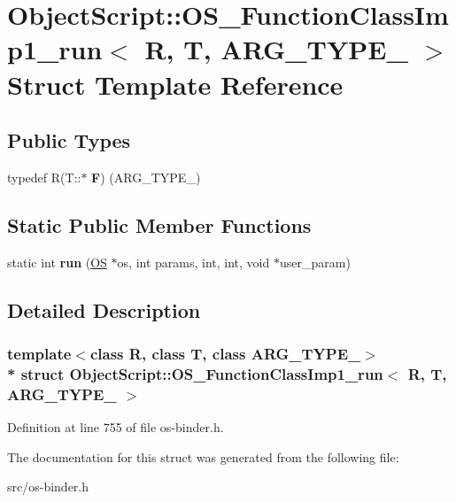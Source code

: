 \hypertarget{struct_object_script_1_1_o_s___function_class_imp1__run}{}\section{Object\+Script\+:\+:O\+S\+\_\+\+Function\+Class\+Imp1\+\_\+run$<$ R, T, A\+R\+G\+\_\+\+T\+Y\+P\+E\+\_ $>$ Struct Template Reference}
\label{struct_object_script_1_1_o_s___function_class_imp1__run}
\subsection*{Public Types}
\begin{DoxyCompactItemize}
\item 
typedef R(T\+::$\ast$ {\bfseries F}) (A\+R\+G\+\_\+\+T\+Y\+P\+E\+\_)\hypertarget{struct_object_script_1_1_o_s___function_class_imp1__run_aba3702ab780ea2bdafe90415b53e7c28}{}\label{struct_object_script_1_1_o_s___function_class_imp1__run_aba3702ab780ea2bdafe90415b53e7c28}

\end{DoxyCompactItemize}
\subsection*{Static Public Member Functions}
\begin{DoxyCompactItemize}
\item 
static int {\bfseries run} (\hyperlink{class_object_script_1_1_o_s}{OS} $\ast$os, int params, int, int, void $\ast$user\+\_\+param)\hypertarget{struct_object_script_1_1_o_s___function_class_imp1__run_a90980810a15833b0f2a37046a675fff5}{}\label{struct_object_script_1_1_o_s___function_class_imp1__run_a90980810a15833b0f2a37046a675fff5}

\end{DoxyCompactItemize}


\subsection{Detailed Description}
\subsubsection*{template$<$class R, class T, class A\+R\+G\+\_\+\+T\+Y\+P\+E\+\_$>$\\*
struct Object\+Script\+::\+O\+S\+\_\+\+Function\+Class\+Imp1\+\_\+run$<$ R, T, A\+R\+G\+\_\+\+T\+Y\+P\+E\+\_ $>$}



Definition at line 755 of file os-\/binder.\+h.



The documentation for this struct was generated from the following file\+:\begin{DoxyCompactItemize}
\item 
src/os-\/binder.\+h\end{DoxyCompactItemize}
